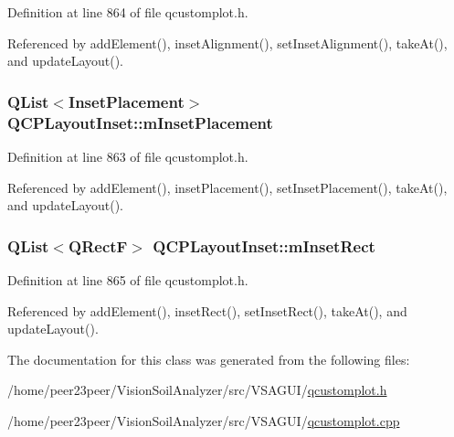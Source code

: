 Definition at line 864 of file qcustomplot.\+h.



Referenced by add\+Element(), inset\+Alignment(), set\+Inset\+Alignment(), take\+At(), and update\+Layout().

\hypertarget{class_q_c_p_layout_inset_a57a0a4e445cc78eada29765ecf092abe}{}
\subsubsection[{m\+Inset\+Placement}]{\setlength{\rightskip}{0pt plus 5cm}Q\+List$<${\bf Inset\+Placement}$>$ Q\+C\+P\+Layout\+Inset\+::m\+Inset\+Placement\hspace{0.3cm}{\ttfamily [protected]}}\label{class_q_c_p_layout_inset_a57a0a4e445cc78eada29765ecf092abe}


Definition at line 863 of file qcustomplot.\+h.



Referenced by add\+Element(), inset\+Placement(), set\+Inset\+Placement(), take\+At(), and update\+Layout().

\hypertarget{class_q_c_p_layout_inset_aaa8f6b5029458f3d97a65239524a2b33}{}
\subsubsection[{m\+Inset\+Rect}]{\setlength{\rightskip}{0pt plus 5cm}Q\+List$<$Q\+Rect\+F$>$ Q\+C\+P\+Layout\+Inset\+::m\+Inset\+Rect\hspace{0.3cm}{\ttfamily [protected]}}\label{class_q_c_p_layout_inset_aaa8f6b5029458f3d97a65239524a2b33}


Definition at line 865 of file qcustomplot.\+h.



Referenced by add\+Element(), inset\+Rect(), set\+Inset\+Rect(), take\+At(), and update\+Layout().



The documentation for this class was generated from the following files\+:\begin{DoxyCompactItemize}
\item 
/home/peer23peer/\+Vision\+Soil\+Analyzer/src/\+V\+S\+A\+G\+U\+I/\hyperlink{qcustomplot_8h}{qcustomplot.\+h}\item 
/home/peer23peer/\+Vision\+Soil\+Analyzer/src/\+V\+S\+A\+G\+U\+I/\hyperlink{qcustomplot_8cpp}{qcustomplot.\+cpp}\end{DoxyCompactItemize}

